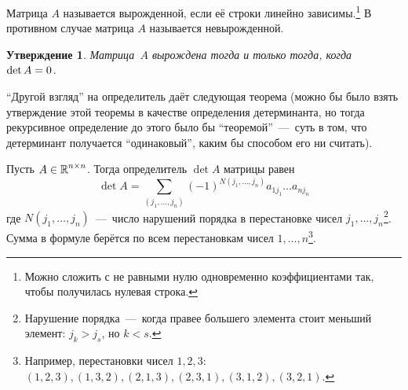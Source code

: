 \documentclass[a4paper,12pt]{article}
\newtheorem{proposition}{Утверждение}[section]
\theoremstyle{remark}
\begin{document}
  \begin{definition}
    Матрица $A$ называется вырожденной, если её строки линейно зависимы.\footnote{Можно сложить с не равными нулю одновременно коэффициентами так, чтобы получилась нулевая строка.}
    В противном случае матрица $A$ называется невырожденной.
  \end{definition}
  
  \begin{proposition}
    Матрица~$A$ вырождена тогда и только тогда, когда $\det A \hm= 0$.
  \end{proposition}
  
  ``Другой взгляд'' на определитель даёт следующая теорема (можно бы было взять утверждение этой теоремы в качестве определения детерминанта, но тогда рекурсивное определение до этого было бы ``теоремой''~---~суть в том, что детерминант получается ``одинаковый'', каким бы способом его ни считать).
  
  \begin{theorem}\label{theor:complete-expansion}
    Пусть $A \in \operatorname{\mathbb R}^{n \times n}$.
    Тогда определитель $\det A$ матрицы равен
    \begin{equation}
      \label{eq:complete-expansion}
      \det A = \sum_{(j_1, \ldots, j_n)} (-1)^{N(j_1, \ldots, j_n)} a_{1 j_1} \ldots a_{n j_n}
    \end{equation}
    где $N(j_1, \ldots, j_n)$~---~число нарушений порядка в перестановке чисел $j_1, \ldots, j_n$\footnote{Нарушение порядка~---~когда правее большего элемента стоит меньший элемент: $j_k > j_s$, но $k < s$.}.
    Сумма в формуле берётся по всем перестановкам чисел $1, \ldots, n$\footnote{Например, перестановки чисел $1, 2, 3$: $(1, 2, 3), (1, 3, 2), (2, 1, 3), (2, 3, 1), (3, 1, 2), (3, 2, 1)$.}.
  \end{theorem}
  
\end{document}
